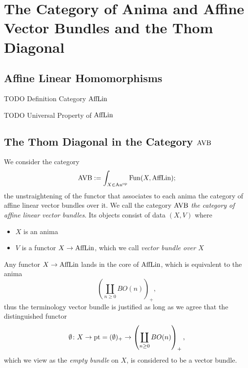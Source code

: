 \section{The Category of Anima and Affine Vector Bundles and the Thom Diagonal}\label{sec:AVBs}

\subsection{Affine Linear Homomorphisms}\label{sec:AffLin}

TODO Definition Category $\operatorname{AffLin}$ 


TODO Universal Property of $\operatorname{AffLin}$

\subsection{The Thom Diagonal in the Category $\operatorname{AVB}$}\label{section:ThomDiagonal}
\begin{construction}
    We consider the category 
    \[ 
        \operatorname{AVB} := \int_{X \in \operatorname{An}^{\mathrm{op}}} \operatorname{Fun}(X, \operatorname{AffLin});
    \] 
    the unstraightening of the functor that associates to 
    each anima the category of 
    affine linear vector bundles over it. 
    We call the category $\operatorname{AVB}$ \emph{the category of affine linear 
    vector bundles}.
    Its objects consist of data $(X,V)$ where 
    \begin{itemize}
        \item $X$ is an anima 
        \item $V$ is a functor $X \to \operatorname{AffLin}$, which we call \emph{vector bundle over $X$}
    \end{itemize}


\end{construction}

\begin{remark}
    Any functor $X \to \operatorname{AffLin}$ lands in the core of $\operatorname{AffLin}$, which is 
    equivalent to the anima
    \[ 
        \left( \coprod_{n \geq 0} BO(n) \right)_+,
    \] 
    thus the terminology vector bundle is justified as long as we agree
    that the distinguished functor 
    \[
       \emptyset \colon  X \to \mathrm{pt} = (\emptyset)_+ \to \left(\coprod_{n \geq 0} BO(n)\right)_+,  
    \]
    which we view as the \emph{empty bundle} on $X$, is considered to be a vector bundle.
\end{remark}


